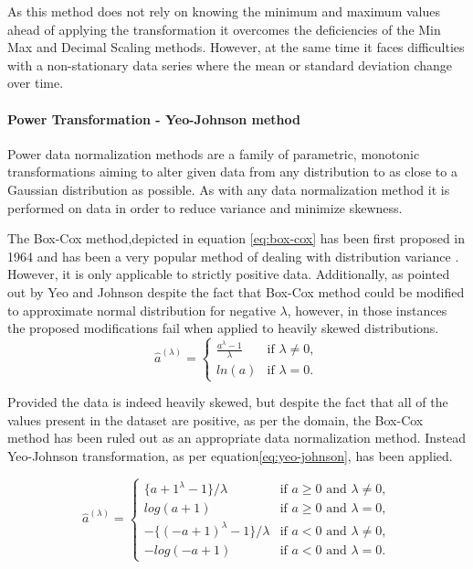 As this method does not rely on knowing the minimum and maximum values ahead of applying the transformation it overcomes the deficiencies of the Min Max and Decimal Scaling methods\cite{dataNormalization2014}. However, at the same time it faces difficulties with a non-stationary data series where the mean or standard deviation change over time.

\paragraph{Power Transformation - Yeo-Johnson method} \label{sec:data-modelling:scalers:power-yeo-johnson}
Power data normalization methods are a family of parametric, monotonic transformations aiming to alter given data from any distribution to as close to a Gaussian distribution as possible. As with any data normalization method it is performed on data in order to reduce variance and minimize skewness.

The Box-Cox method,depicted in equation \ref{eq:box-cox} has been first proposed in 1964\cite{boxCox1964} and has been a very popular method of dealing with distribution variance \cite{YANG200614}. However, it is only applicable to strictly positive data\cite{YANG200614}. 
Additionally, as pointed out by Yeo and Johnson \cite{yeo-johnson-original} despite the fact that Box-Cox method could be modified to approximate normal distribution for negative $\lambda$, however, in those instances the proposed modifications fail when applied to heavily skewed distributions.
\begin{equation}\label{eq:box-cox}
    \hat{a}^{(\lambda)}=\begin{cases} \frac {{a}^{\lambda } - 1 }{\lambda}& \text{if $\lambda \neq 0$},\\
    ln(a)& \text{if $\lambda=0$}.
\end{cases}
\end{equation}

Provided the data is indeed heavily skewed, but despite the fact that all of the values present in the dataset are positive, as per the domain, the Box-Cox method has been ruled out as an appropriate data normalization method. Instead Yeo-Johnson transformation, as per equation\ref{eq:yeo-johnson}, has been applied.

\begin{equation}\label{eq:yeo-johnson}
    \hat{a}^{(\lambda)}=\begin{cases} {\{{a +1}^{\lambda } - 1 }\}/ {\lambda}& \text{if $a \geq 0$ and $\lambda \neq 0$},\\
    log(a+1)& \text{if $a\geq 0$ and $\lambda=0$},\\
    -\{(-a +1)^\lambda -1\}/\lambda & \text{if $a < 0$ and $\lambda \neq 0$},\\
    -log(-a +1) & \text{if $a < 0$ and $\lambda = 0$}.
    
\end{cases}
\end{equation}

